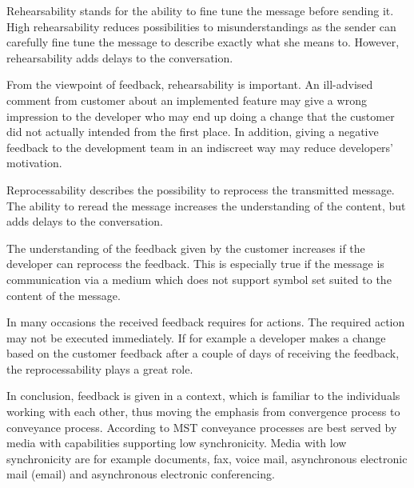 \documentclass[conference]{IEEEtran}
\begin{document}
Rehearsability stands for the ability to fine tune the message before sending it. High rehearsability reduces possibilities to misunderstandings as the sender can carefully fine tune the message to describe exactly what she means to. However, rehearsability adds delays to the conversation. \cite{2008dennis} 

From the viewpoint of feedback, rehearsability is important. An ill-advised comment from customer about an implemented feature may give a wrong impression to the developer who may end up doing a change that the customer did not actually intended from the first place. In addition, giving a negative feedback to the development team in an indiscreet way may reduce developers' motivation.

Reprocessability describes the possibility to reprocess the transmitted message. The ability to reread the message increases the understanding of the content, but adds delays to the conversation. \cite{2008dennis}

The understanding of the feedback given by the customer increases if the developer can reprocess the feedback. This is especially true if the message is communication via a medium which does not support symbol set suited to the content of the message. 

In many occasions the received feedback requires for actions. The required action may not be executed immediately. If for example a developer makes a change based on the customer feedback after a couple of days of receiving the feedback, the reprocessability plays a great role.

In conclusion, feedback is given in a context, which is familiar to the individuals working with each other, thus moving the emphasis from convergence process to conveyance process. According to MST conveyance processes are best served by media with capabilities supporting low synchronicity. Media with low synchronicity are for example documents, fax, voice mail, asynchronous electronic mail (email) and asynchronous electronic conferencing. \cite{2008dennis}
\end{document}
